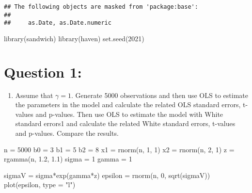 \documentclass[
]{article}
\newenvironment{Shaded}{\begin{snugshade}}{\end{snugshade}}
\newcommand{\AttributeTok}[1]{\textcolor[rgb]{0.77,0.63,0.00}{#1}}
\newcommand{\DecValTok}[1]{\textcolor[rgb]{0.00,0.00,0.81}{#1}}
\newcommand{\FloatTok}[1]{\textcolor[rgb]{0.00,0.00,0.81}{#1}}
\newcommand{\FunctionTok}[1]{\textcolor[rgb]{0.00,0.00,0.00}{#1}}
\newcommand{\NormalTok}[1]{#1}
\newcommand{\OtherTok}[1]{\textcolor[rgb]{0.56,0.35,0.01}{#1}}
\newcommand{\SpecialCharTok}[1]{\textcolor[rgb]{0.00,0.00,0.00}{#1}}
\newcommand{\StringTok}[1]{\textcolor[rgb]{0.31,0.60,0.02}{#1}}
\providecommand{\tightlist}{%
  \setlength{\itemsep}{0pt}\setlength{\parskip}{0pt}}
\begin{document}
\begin{verbatim}
## The following objects are masked from 'package:base':
## 
##     as.Date, as.Date.numeric
\end{verbatim}

\begin{Shaded}
\begin{Highlighting}[]
\FunctionTok{library}\NormalTok{(sandwich)}
\FunctionTok{library}\NormalTok{(haven)}
\FunctionTok{set.seed}\NormalTok{(}\DecValTok{2021}\NormalTok{)}
\end{Highlighting}
\end{Shaded}

\hypertarget{question-1}{%
\section{Question 1:}\label{question-1}}

\begin{enumerate}
\def\labelenumi{\alph{enumi})}
\tightlist
\item
  Assume that \(\gamma = 1\). Generate 5000 observations and then use
  OLS to estimate the parameters in the model and calculate the related
  OLS standard errors, t-values and p-values. Then use OLS to estimate
  the model with White standard errors1 and calculate the related White
  standard errors, t-values and p-values. Compare the results.
\end{enumerate}

\begin{Shaded}
\begin{Highlighting}[]
\NormalTok{n }\OtherTok{=} \DecValTok{5000}
\NormalTok{b0 }\OtherTok{=} \DecValTok{3}
\NormalTok{b1 }\OtherTok{=} \DecValTok{5}
\NormalTok{b2 }\OtherTok{=} \DecValTok{8}
\NormalTok{x1 }\OtherTok{=} \FunctionTok{rnorm}\NormalTok{(n, }\DecValTok{1}\NormalTok{, }\DecValTok{1}\NormalTok{)}
\NormalTok{x2 }\OtherTok{=} \FunctionTok{rnorm}\NormalTok{(n, }\DecValTok{2}\NormalTok{, }\DecValTok{1}\NormalTok{)}
\NormalTok{z }\OtherTok{=} \FunctionTok{rgamma}\NormalTok{(n, }\FloatTok{1.2}\NormalTok{, }\FloatTok{1.1}\NormalTok{)}
\NormalTok{sigma }\OtherTok{=} \DecValTok{1}
\NormalTok{gamma }\OtherTok{=} \DecValTok{1}
\end{Highlighting}
\end{Shaded}

\begin{Shaded}
\begin{Highlighting}[]
\NormalTok{sigmaV }\OtherTok{=}\NormalTok{ sigma}\SpecialCharTok{*}\FunctionTok{exp}\NormalTok{(gamma}\SpecialCharTok{*}\NormalTok{z)}
\NormalTok{epsilon }\OtherTok{=} \FunctionTok{rnorm}\NormalTok{(n, }\DecValTok{0}\NormalTok{, }\FunctionTok{sqrt}\NormalTok{(sigmaV))}
\FunctionTok{plot}\NormalTok{(epsilon, }\AttributeTok{type =} \StringTok{"l"}\NormalTok{)}
\end{Highlighting}
\end{Shaded}
\end{document}
